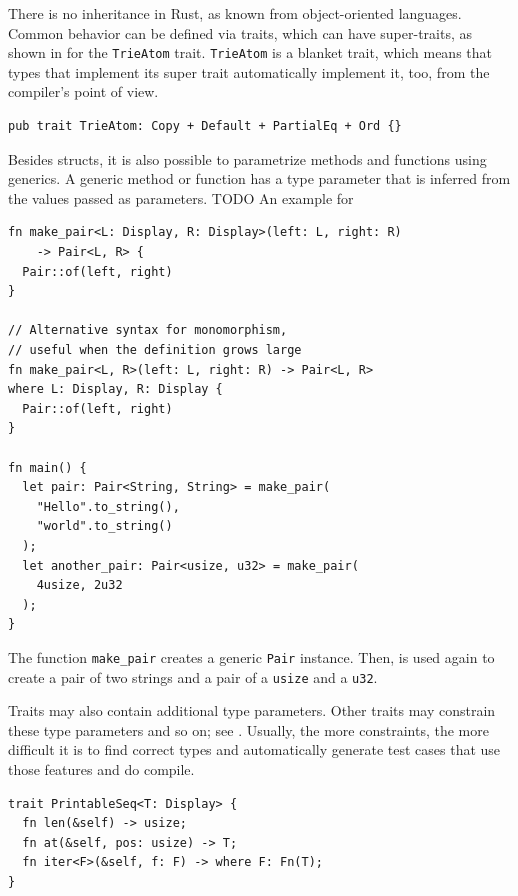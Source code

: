 \documentclass[paper=a4,%
  twoside,%
  BCOR4mm,%
  abstract=true,%
  toc=bibliography,%
  chapterprefix=true,%
  toc=bibliographynumbered,%
  open=right,%
  english,%
  pagesize=pdftex]{scrreprt}
\begin{document}
There is no inheritance in Rust, as known from object-oriented languages. Common behavior can be defined via traits, which can have super-traits, as shown in  for the \texttt{TrieAtom} trait. \texttt{TrieAtom} is a blanket trait, which means that types that implement its super trait automatically implement it, too, from the compiler's point of view.
\begin{lstlisting}[style=boxed, caption={An example trait from the \emph{trying} crate which we evaluate the approach on}, label=lst:trying-supertraits]
pub trait TrieAtom: Copy + Default + PartialEq + Ord {}
\end{lstlisting}

Besides structs, it is also possible to parametrize methods and functions using generics. A generic method or function has a type parameter that is inferred from the values passed as parameters. TODO An example for
\begin{lstlisting}[style=boxed, caption={Variants of defining a generic function}, label=lst:function-monomorphization]
fn make_pair<L: Display, R: Display>(left: L, right: R)
    -> Pair<L, R> {
  Pair::of(left, right)
}

// Alternative syntax for monomorphism,
// useful when the definition grows large
fn make_pair<L, R>(left: L, right: R) -> Pair<L, R>
where L: Display, R: Display {
  Pair::of(left, right)
}

fn main() {
  let pair: Pair<String, String> = make_pair(
    "Hello".to_string(),
    "world".to_string()
  );
  let another_pair: Pair<usize, u32> = make_pair(
    4usize, 2u32
  );
}
\end{lstlisting}

The function \texttt{make\string_pair} creates a generic \texttt{Pair} instance. Then, is used again to create a pair of two strings and a pair of a \texttt{usize} and a \texttt{u32}.

Traits may also contain additional type parameters. Other traits may constrain these type parameters and so on; see . Usually, the more constraints, the more difficult it is to find correct types and automatically generate test cases that use those features and do compile.

\begin{lstlisting}[style=boxed, caption={Type parameters can be specified for a trait to make it generic. These appear after the trait name, using the same syntax used in generic functions}, label=lst:traits-with-type-bounds]
trait PrintableSeq<T: Display> {
  fn len(&self) -> usize;
  fn at(&self, pos: usize) -> T;
  fn iter<F>(&self, f: F) -> where F: Fn(T);
}
\end{lstlisting}
\end{document}
